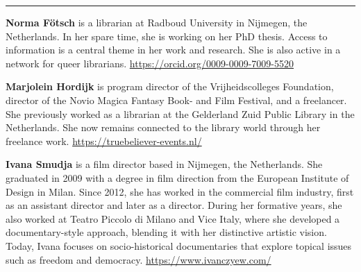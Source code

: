 \begin{center}\rule{0.5\linewidth}{0.5pt}\end{center}

\textbf{Norma Fötsch} is a
librarian at Radboud University in Nijmegen, the Netherlands. In her
spare time, she is working on her PhD thesis. Access to information is a
central theme in her work and research. She is also active in a network
for queer librarians.
\url{https://orcid.org/0009-0009-7009-5520}

\textbf{Marjolein Hordijk} is program director of the Vrijheidscolleges
Foundation, director of the Novio Magica Fantasy Book- and Film
Festival, and a freelancer. She previously worked as a librarian at the
Gelderland Zuid Public Library in the Netherlands. She now remains
connected to the library world through her freelance work.
\url{https://truebeliever-events.nl/}

\textbf{Ivana Smudja} is a film director based in Nijmegen, the Netherlands. She
graduated in 2009 with a degree in film direction from the European
Institute of Design in Milan. Since 2012, she has worked in the
commercial film industry, first as an assistant director and later as a
director. During her formative years, she also worked at Teatro Piccolo
di Milano and Vice Italy, where she developed a documentary-style
approach, blending it with her distinctive artistic vision. Today, Ivana
focuses on socio-historical documentaries that explore topical issues
such as freedom and democracy.
\url{https://www.ivanczyew.com/}
